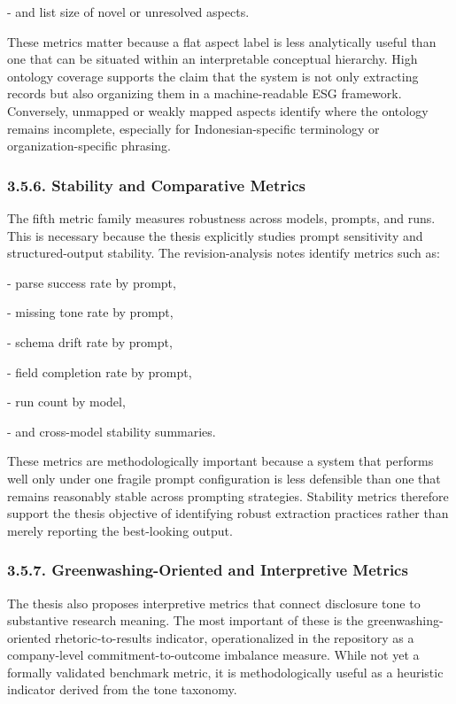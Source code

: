 \documentclass{article}
\begin{document}
- and list size of novel or unresolved aspects.

These metrics matter because a flat aspect label is less analytically useful than one that can be situated within an interpretable conceptual hierarchy. High ontology coverage supports the claim that the system is not only extracting records but also organizing them in a machine-readable ESG framework. Conversely, unmapped or weakly mapped aspects identify where the ontology remains incomplete, especially for Indonesian-specific terminology or organization-specific phrasing.
\subsubsection*{ 3.5.6. Stability and Comparative Metrics}

The fifth metric family measures robustness across models, prompts, and runs. This is necessary because the thesis explicitly studies prompt sensitivity and structured-output stability. The revision-analysis notes identify metrics such as:

- parse success rate by prompt,

- missing tone rate by prompt,

- schema drift rate by prompt,

- field completion rate by prompt,

- run count by model,

- and cross-model stability summaries.

These metrics are methodologically important because a system that performs well only under one fragile prompt configuration is less defensible than one that remains reasonably stable across prompting strategies. Stability metrics therefore support the thesis objective of identifying robust extraction practices rather than merely reporting the best-looking output.
\subsubsection*{ 3.5.7. Greenwashing-Oriented and Interpretive Metrics}

The thesis also proposes interpretive metrics that connect disclosure tone to substantive research meaning. The most important of these is the greenwashing-oriented rhetoric-to-results indicator, operationalized in the repository as a company-level commitment-to-outcome imbalance measure. While not yet a formally validated benchmark metric, it is methodologically useful as a heuristic indicator derived from the tone taxonomy.
\end{document}
